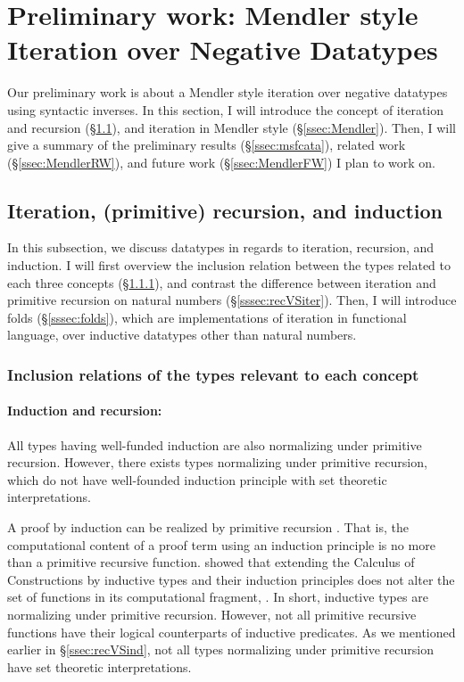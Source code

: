\section{Preliminary work: Mendler style Iteration over Negative Datatypes}
\label{sec:prelim}
Our preliminary work \cite{AhnShe11} is about a Mendler style iteration over
negative datatypes using syntactic inverses. In this section, I will
introduce the concept of iteration and recursion (\S\ref{ssec:iter}),
and iteration in Mendler style (\S\ref{ssec:Mendler}). Then, I will give
a summary of the preliminary results (\S\ref{ssec:msfcata}),
related work (\S\ref{ssec:MendlerRW}), and
future work (\S\ref{ssec:MendlerFW}) I plan to work on.

\subsection{Iteration, (primitive) recursion, and induction} \label{ssec:iter}
In this subsection, we discuss datatypes in regards to iteration, recursion,
and induction.
I will first overview the inclusion relation between the types related to
each three concepts (\S\ref{sssec:inclusionIterRecInd}), and contrast
the difference between iteration and primitive recursion on natural numbers
(\S\ref{sssec:recVSiter}). Then, I will introduce folds (\S\ref{sssec:folds}),
which are implementations of iteration in functional language,
over inductive datatypes other than natural numbers.

\subsubsection{Inclusion relations of the types relevant to each concept}
\label{sssec:inclusionIterRecInd}

\paragraph{Induction and recursion:}
All types having well-funded induction are also normalizing under
primitive recursion. However, there exists types normalizing under
primitive recursion, which do not have well-founded induction principle
with set theoretic interpretations.

A proof by induction can be realized by primitive recursion \cite{PfePau90}.
That is, the computational content of a proof term using an induction principle
is no more than a primitive recursive function. \citet{PfePau90} showed that
extending the Calculus of Constructions by inductive types and their induction
principles does not alter the set of functions in its computational fragment,
\Fw. In short, inductive types are normalizing under primitive recursion.
However, not all primitive recursive functions have their logical counterparts
of inductive predicates. As we mentioned earlier in \S\ref{ssec:recVSind},
not all types normalizing under primitive recursion have set theoretic
interpretations.

